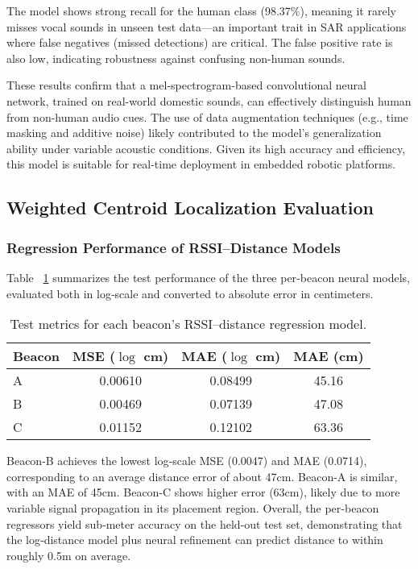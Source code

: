 The model shows strong recall for the human class (98.37\%), meaning it rarely misses vocal sounds in unseen test data—an important trait in SAR applications where false negatives (missed detections) are critical. The false positive rate is also low, indicating robustness against confusing non-human sounds.

These results confirm that a mel-spectrogram-based convolutional neural network, trained on real-world domestic sounds, can effectively distinguish human from non-human audio cues. The use of data augmentation techniques (e.g., time masking and additive noise) likely contributed to the model's generalization ability under variable acoustic conditions. Given its high accuracy and efficiency, this model is suitable for real-time deployment in embedded robotic platforms.

\subsection{Weighted Centroid Localization Evaluation}

\subsubsection{Regression Performance of RSSI–Distance Models}

Table ~\ref{tab:beacon_metrics} summarizes the test performance of the three per‑beacon neural models, evaluated both in log‑scale and converted to absolute error in centimeters.

\begin{table}[t]
\centering
\caption{Test metrics for each beacon’s RSSI–distance regression model.}
\label{tab:beacon_metrics}
\begin{tabular}{lccc}
\toprule
\textbf{Beacon} & \textbf{MSE (${\log}$ cm)} & \textbf{MAE (${\log}$ cm)} & \textbf{MAE (cm)} \\
\midrule
A & 0.00610 & 0.08499 & 45.16 \\
B & 0.00469 & 0.07139 & 47.08 \\
C & 0.01152 & 0.12102 & 63.36 \\
\bottomrule
\end{tabular}
\end{table}

Beacon-B achieves the lowest log‑scale MSE (0.0047) and MAE (0.0714), corresponding to an average distance error of about 47cm. Beacon-A is similar, with an MAE of 45cm. Beacon-C shows higher error (63cm), likely due to more variable signal propagation in its placement region. Overall, the per‑beacon regressors yield sub‑meter accuracy on the held‑out test set, demonstrating that the log‑distance model plus neural refinement can predict distance to within roughly 0.5m on average.


